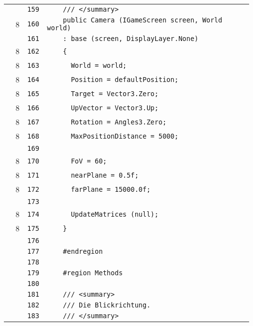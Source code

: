 \documentclass[a4paper,10pt]{article}
\begin{document}
\begin{longtable}[l]{lrrl}
\cellcolor{gray} &  & \verb~159~ & \verb~    /// </summary>~\\
\cellcolor{green} & 8 & \verb~160~ & \verb~    public Camera (IGameScreen screen, World world)~\\
\cellcolor{gray} &  & \verb~161~ & \verb~    : base (screen, DisplayLayer.None)~\\
\cellcolor{green} & 8 & \verb~162~ & \verb~    {~\\
\cellcolor{green} & 8 & \verb~163~ & \verb~      World = world;~\\
\cellcolor{green} & 8 & \verb~164~ & \verb~      Position = defaultPosition;~\\
\cellcolor{green} & 8 & \verb~165~ & \verb~      Target = Vector3.Zero;~\\
\cellcolor{green} & 8 & \verb~166~ & \verb~      UpVector = Vector3.Up;~\\
\cellcolor{green} & 8 & \verb~167~ & \verb~      Rotation = Angles3.Zero;~\\
\cellcolor{green} & 8 & \verb~168~ & \verb~      MaxPositionDistance = 5000;~\\
\cellcolor{gray} &  & \verb~169~ & \verb~~\\
\cellcolor{green} & 8 & \verb~170~ & \verb~      FoV = 60;~\\
\cellcolor{green} & 8 & \verb~171~ & \verb~      nearPlane = 0.5f;~\\
\cellcolor{green} & 8 & \verb~172~ & \verb~      farPlane = 15000.0f;~\\
\cellcolor{gray} &  & \verb~173~ & \verb~~\\
\cellcolor{green} & 8 & \verb~174~ & \verb~      UpdateMatrices (null);~\\
\cellcolor{green} & 8 & \verb~175~ & \verb~    }~\\
\cellcolor{gray} &  & \verb~176~ & \verb~~\\
\cellcolor{gray} &  & \verb~177~ & \verb~    #endregion~\\
\cellcolor{gray} &  & \verb~178~ & \verb~~\\
\cellcolor{gray} &  & \verb~179~ & \verb~    #region Methods~\\
\cellcolor{gray} &  & \verb~180~ & \verb~~\\
\cellcolor{gray} &  & \verb~181~ & \verb~    /// <summary>~\\
\cellcolor{gray} &  & \verb~182~ & \verb~    /// Die Blickrichtung.~\\
\cellcolor{gray} &  & \verb~183~ & \verb~    /// </summary>~\\

\end{longtable}
\end{document}
